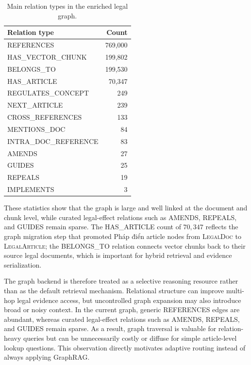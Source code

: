 \documentclass[11pt,twocolumn]{article}
\begin{document}
\begin{table}[!htbp]
\centering
\caption{Main relation types in the enriched legal graph.}
\label{tab:graph_relations}
\small
\begin{tabular}{lr}
\toprule
\textbf{Relation type} & \textbf{Count} \\
\midrule
\textsc{REFERENCES} & 769,000 \\
\textsc{HAS\_VECTOR\_CHUNK} & 199,802 \\
\textsc{BELONGS\_TO} & 199,530 \\
\textsc{HAS\_ARTICLE} & 70,347 \\
\textsc{REGULATES\_CONCEPT} & 249 \\
\textsc{NEXT\_ARTICLE} & 239 \\
\textsc{CROSS\_REFERENCES} & 133 \\
\textsc{MENTIONS\_DOC} & 84 \\
\textsc{INTRA\_DOC\_REFERENCE} & 83 \\
\textsc{AMENDS} & 27 \\
\textsc{GUIDES} & 25 \\
\textsc{REPEALS} & 19 \\
\textsc{IMPLEMENTS} & 3 \\
\bottomrule
\end{tabular}
\end{table}

These statistics show that the graph is large and well linked
at the document and chunk level, while curated legal-effect
relations such as \textsc{AMENDS}, \textsc{REPEALS}, and
\textsc{GUIDES} remain sparse. The \textsc{HAS\_ARTICLE}
count of $70{,}347$ reflects the graph migration step that
promoted Pháp điển article nodes from \textsc{LegalDoc} to
\textsc{LegalArticle}; the \textsc{BELONGS\_TO} relation
connects vector chunks back to their source legal documents,
which is important for hybrid retrieval and evidence
serialization.

The graph backend is therefore treated as a selective
reasoning resource rather than as the default retrieval
mechanism. Relational structure can improve multi-hop legal
evidence access, but uncontrolled graph expansion may also
introduce broad or noisy context. In the current graph,
generic \textsc{REFERENCES} edges are abundant, whereas
curated legal-effect relations such as \textsc{AMENDS},
\textsc{REPEALS}, and \textsc{GUIDES} remain sparse. As a
result, graph traversal is valuable for relation-heavy
queries but can be unnecessarily costly or diffuse for simple
article-level lookup questions. This observation directly
motivates adaptive routing instead of always applying
GraphRAG.
\end{document}
